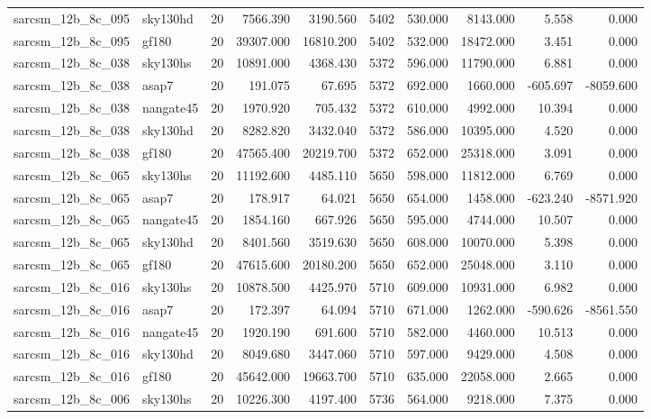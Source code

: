 \begin{tabular}{llrrrrrrrr}
sarcsm\_12b\_8c\_095 & sky130hd & 20 & 7566.390 & 3190.560 & 5402 & 530.000 & 8143.000 & 5.558 & 0.000 \\
sarcsm\_12b\_8c\_095 & gf180 & 20 & 39307.000 & 16810.200 & 5402 & 532.000 & 18472.000 & 3.451 & 0.000 \\
sarcsm\_12b\_8c\_038 & sky130hs & 20 & 10891.000 & 4368.430 & 5372 & 596.000 & 11790.000 & 6.881 & 0.000 \\
sarcsm\_12b\_8c\_038 & asap7 & 20 & 191.075 & 67.695 & 5372 & 692.000 & 1660.000 & -605.697 & -8059.600 \\
sarcsm\_12b\_8c\_038 & nangate45 & 20 & 1970.920 & 705.432 & 5372 & 610.000 & 4992.000 & 10.394 & 0.000 \\
sarcsm\_12b\_8c\_038 & sky130hd & 20 & 8282.820 & 3432.040 & 5372 & 586.000 & 10395.000 & 4.520 & 0.000 \\
sarcsm\_12b\_8c\_038 & gf180 & 20 & 47565.400 & 20219.700 & 5372 & 652.000 & 25318.000 & 3.091 & 0.000 \\
sarcsm\_12b\_8c\_065 & sky130hs & 20 & 11192.600 & 4485.110 & 5650 & 598.000 & 11812.000 & 6.769 & 0.000 \\
sarcsm\_12b\_8c\_065 & asap7 & 20 & 178.917 & 64.021 & 5650 & 654.000 & 1458.000 & -623.240 & -8571.920 \\
sarcsm\_12b\_8c\_065 & nangate45 & 20 & 1854.160 & 667.926 & 5650 & 595.000 & 4744.000 & 10.507 & 0.000 \\
sarcsm\_12b\_8c\_065 & sky130hd & 20 & 8401.560 & 3519.630 & 5650 & 608.000 & 10070.000 & 5.398 & 0.000 \\
sarcsm\_12b\_8c\_065 & gf180 & 20 & 47615.600 & 20180.200 & 5650 & 652.000 & 25048.000 & 3.110 & 0.000 \\
sarcsm\_12b\_8c\_016 & sky130hs & 20 & 10878.500 & 4425.970 & 5710 & 609.000 & 10931.000 & 6.982 & 0.000 \\
sarcsm\_12b\_8c\_016 & asap7 & 20 & 172.397 & 64.094 & 5710 & 671.000 & 1262.000 & -590.626 & -8561.550 \\
sarcsm\_12b\_8c\_016 & nangate45 & 20 & 1920.190 & 691.600 & 5710 & 582.000 & 4460.000 & 10.513 & 0.000 \\
sarcsm\_12b\_8c\_016 & sky130hd & 20 & 8049.680 & 3447.060 & 5710 & 597.000 & 9429.000 & 4.508 & 0.000 \\
sarcsm\_12b\_8c\_016 & gf180 & 20 & 45642.000 & 19663.700 & 5710 & 635.000 & 22058.000 & 2.665 & 0.000 \\
sarcsm\_12b\_8c\_006 & sky130hs & 20 & 10226.300 & 4197.400 & 5736 & 564.000 & 9218.000 & 7.375 & 0.000 \\

\end{tabular}
